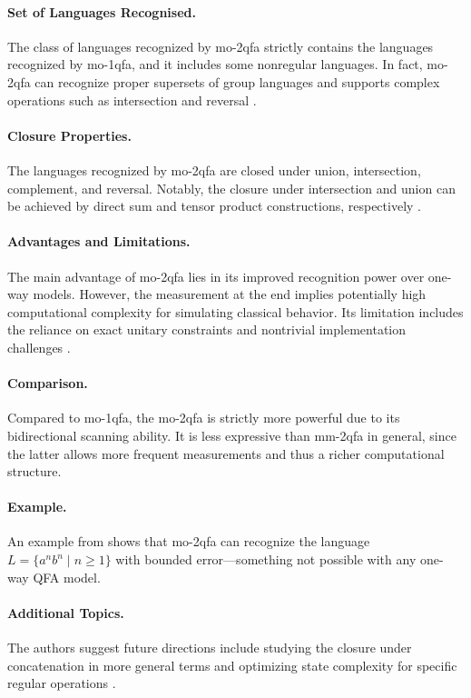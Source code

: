 \paragraph{Set of Languages Recognised.} The class of languages recognized by \gls{mo-2qfa} strictly contains the languages recognized by \gls{mo-1qfa}, and it includes some nonregular languages. In fact, \gls{mo-2qfa} can recognize proper supersets of group languages and supports complex operations such as intersection and reversal \cite{xi2008some}.

\paragraph{Closure Properties.} The languages recognized by \gls{mo-2qfa} are closed under union, intersection, complement, and reversal. Notably, the closure under intersection and union can be achieved by direct sum and tensor product constructions, respectively \cite{xi2008some}.

\paragraph{Advantages and Limitations.} The main advantage of \gls{mo-2qfa} lies in its improved recognition power over one-way models. However, the measurement at the end implies potentially high computational complexity for simulating classical behavior. Its limitation includes the reliance on exact unitary constraints and nontrivial implementation challenges \cite{xi2008some}.

\paragraph{Comparison.} Compared to \gls{mo-1qfa}, the \gls{mo-2qfa} is strictly more powerful due to its bidirectional scanning ability. It is less expressive than \gls{mm-2qfa} in general, since the latter allows more frequent measurements and thus a richer computational structure.

\paragraph{Example.} An example from \cite{xi2008some} shows that \gls{mo-2qfa} can recognize the language $L = \{ a^nb^n \mid n \geq 1 \}$ with bounded error—something not possible with any one-way QFA model.

\paragraph{Additional Topics.} The authors suggest future directions include studying the closure under concatenation in more general terms and optimizing state complexity for specific regular operations \cite{xi2008some}.

